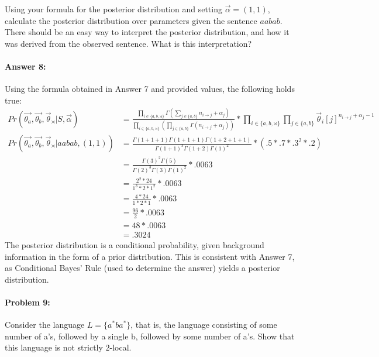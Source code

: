 \documentclass[10pt]{article}
\begin{document}
Using your formula for the posterior distribution and setting
$\vec{\alpha} = (1,1)$, calculate the posterior distribution over
parameters given the sentence $aabab$. There should be an easy way to
interpret the posterior distribution, and how it was derived from the
observed sentence. What is this interpretation?

\paragraph{Answer 8:} Using the formula obtained in Answer 7 and provided values, the following holds true:
\begin{equation*}
    \begin{split}
        Pr(\vec{\theta_a}, \vec{\theta_b}, \vec{\theta}_{\rtimes} | S, \vec{\alpha}) 
        &= \frac{\prod_{i \in \{a,b,\rtimes\}}\Gamma(\sum_{j \in \{a,b\}} n_{i \rightarrow j} + \alpha_{j})}{\prod_{i\in\{a,b,\rtimes\}}(\prod_{j\in\{a,b\}}\Gamma(n_{i \rightarrow j} + \alpha_{j}))}
        * \prod_{i \in \{a, b, \rtimes\}} \prod_{j \in \{a, b\}} \vec{\theta}_i[j]^{n_{i \rightarrow j}+\alpha_j-1}\\
        Pr(\vec{\theta_a}, \vec{\theta_b}, \vec{\theta}_{\rtimes} | aabab, (1,1))
        &= \frac{\Gamma(1+1+1)\Gamma(1+1+1)\Gamma(1+2+1+1)}{\Gamma(1+1)^3\Gamma(1+2)\Gamma(1)^2} * (.5*.7*.3^2*.2)\\
        &=\frac{\Gamma(3)^2\Gamma(5)}{\Gamma(2)^3\Gamma(3)\Gamma(1)^2}*.0063\\
        &=\frac{2^2*24}{1^3*2*1^2}*.0063\\
        &=\frac{4*24}{1*2*1}*.0063\\
        &=\frac{96}{2}*.0063\\
        &=48*.0063\\
        &=.3024
    \end{split}
\end{equation*}
\noindent The posterior distribution is a conditional probability, given background information in the form of a prior distribution. This is consistent with Answer 7, as Conditional Bayes' Rule (used to determine the answer) yields a posterior distribution.

\hrulefill
\paragraph{Problem 9:}

Consider the language $L=\{a^* b a^*\}$, that is, the language
consisting of some number of a's, followed by a single b, followed by
some number of a's. Show that this language is not strictly
$2$-local.\\
\end{document}
